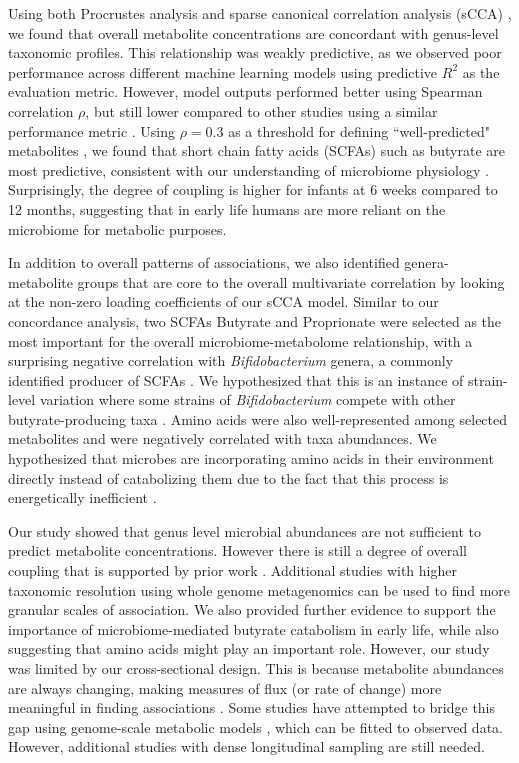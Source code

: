 Using both Procrustes analysis and sparse canonical correlation analysis (sCCA) \cite{witten2009penalized}, we found that overall metabolite concentrations are concordant with genus-level taxonomic profiles. This relationship was weakly predictive, as we observed poor performance across different machine learning models using predictive $R^2$ as the evaluation metric. However, model outputs performed better using Spearman correlation $\rho$, but still lower compared to other studies using a similar performance metric \cite{mallick2019predictive}. Using $\rho = 0.3$ as a threshold for defining ``well-predicted" metabolites \cite{mallick2019predictive, muller2021metaanalysis}, we found that short chain fatty acids (SCFAs) such as butyrate are most predictive, consistent with our understanding of microbiome physiology \cite{leblanc2017beneficial}. Surprisingly, the degree of coupling is higher for infants at 6 weeks compared to 12 months, suggesting that in early life humans are more reliant on the microbiome for metabolic purposes. 

In addition to overall patterns of associations, we also identified genera-metabolite groups that are core to the overall multivariate correlation by looking at the non-zero loading coefficients of our sCCA model. Similar to our concordance analysis, two SCFAs Butyrate and Proprionate were selected as the most important for the overall microbiome-metabolome relationship, with a surprising negative correlation with \emph{Bifidobacterium} genera, a commonly identified producer of SCFAs \cite{james2019metabolism}. We hypothesized that this is an instance of strain-level variation where some strains of \emph{Bifidobacterium} compete with other butyrate-producing taxa \cite{riviere2016bifidobacteria}. Amino acids were also well-represented among selected metabolites and were negatively correlated with taxa abundances. We hypothesized that microbes are incorporating amino acids in their environment directly instead of catabolizing them due to the fact that this process is energetically inefficient \cite{franzosa2014relating, oliphant2019macronutrient}. 

Our study showed that genus level microbial abundances are not sufficient to predict metabolite concentrations. However there is still a degree of overall coupling that is supported by prior work \cite{ayeni2018infant, kisuse2018urban, zierer2018fecal}. Additional studies with higher taxonomic resolution using whole genome metagenomics can be used to find more granular scales of association. We also provided further evidence to support the importance of microbiome-mediated butyrate catabolism in early life, while also suggesting that amino acids might play an important role. However, our study was limited by our cross-sectional design. This is because metabolite abundances are always changing, making measures of flux (or rate of change) more meaningful in finding associations \cite{hollywood2006metabolomics}. Some studies have attempted to bridge this gap using genome-scale metabolic models \cite{noecker2019defining}, which can be fitted to observed data. However, additional studies with dense longitudinal sampling are still needed.   

